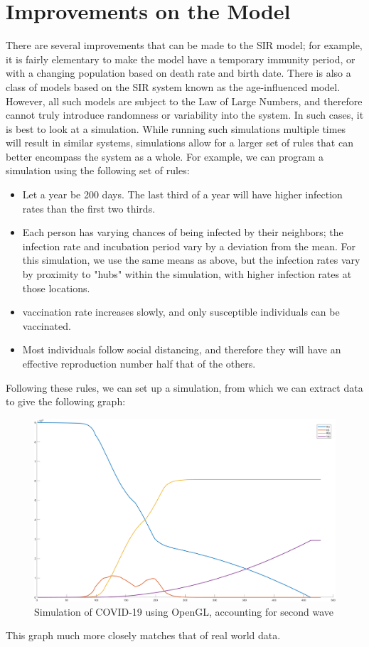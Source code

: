 \documentclass{article}
\begin{document}
\section{Improvements on the Model}
There are several improvements that can be made to the SIR model; for example, it is fairly elementary to make the model have a temporary immunity period, or with a changing population based on death rate and birth date. There is also a class of models based on the SIR system known as the age-influenced model. However, all such models are subject to the Law of Large Numbers, and therefore cannot truly introduce randomness or variability into the system. In such cases, it is best to look at a simulation. While running such simulations multiple times will result in similar systems, simulations allow for a larger set of rules that can better encompass the system as a whole. For example, we can program a simulation using the following set of rules:
\begin{itemize}
    \item Let a year be 200 days. The last third of a year will have higher infection rates than the first two thirds.
    \item Each person has varying chances of being infected by their neighbors; the infection rate and incubation period vary by a deviation from the mean. For this simulation, we use the same means as above, but the infection rates vary by proximity to "hubs" within the simulation, with higher infection rates at those locations.
    \item vaccination rate increases slowly, and only susceptible individuals can be vaccinated.
    \item Most individuals follow social distancing, and therefore they will have an effective reproduction number half that of the others.
\end{itemize}
Following these rules, we can set up a simulation, from which we can extract data to give the following graph:
\begin{figure}[H]
    \centering
    \includegraphics[scale=0.4]{sim1.png}
    \caption{Simulation of COVID-19 using OpenGL, accounting for second wave}
    \label{fig4}
\end{figure}
This graph much more closely matches that of real world data.
\end{document}
